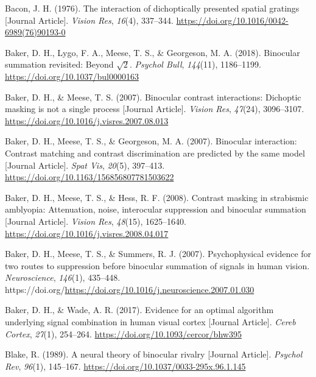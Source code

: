 \documentclass[
  12pt,
]{article}
\newlength{\cslhangindent}
\newenvironment{CSLReferences}[2] %
 {\begin{list}{}{%
  \setlength{\itemindent}{0pt}
  \setlength{\leftmargin}{0pt}
  \setlength{\parsep}{0pt}
  \ifodd #1
   \setlength{\leftmargin}{\cslhangindent}
   \setlength{\itemindent}{-1\cslhangindent}
  \fi
  \setlength{\itemsep}{#2\baselineskip}}}
 {\end{list}}
\begin{document}
\label{refs}
\begin{CSLReferences}{1}{0}
Bacon, J. H. (1976). The interaction of dichoptically presented spatial
gratings {[}Journal Article{]}. \emph{Vision Res}, \emph{16}(4),
337--344. \url{https://doi.org/10.1016/0042-6989(76)90193-0}

Baker, D. H., Lygo, F. A., Meese, T. S., \& Georgeson, M. A. (2018).
Binocular summation revisited: Beyond \(\sqrt{2}\). \emph{Psychol Bull},
\emph{144}(11), 1186--1199. \url{https://doi.org/10.1037/bul0000163}

Baker, D. H., \& Meese, T. S. (2007). Binocular contrast interactions:
Dichoptic masking is not a single process {[}Journal Article{]}.
\emph{Vision Res}, \emph{47}(24), 3096--3107.
\url{https://doi.org/10.1016/j.visres.2007.08.013}

Baker, D. H., Meese, T. S., \& Georgeson, M. A. (2007). Binocular
interaction: Contrast matching and contrast discrimination are predicted
by the same model {[}Journal Article{]}. \emph{Spat Vis}, \emph{20}(5),
397--413. \url{https://doi.org/10.1163/156856807781503622}

Baker, D. H., Meese, T. S., \& Hess, R. F. (2008). Contrast masking in
strabismic amblyopia: Attenuation, noise, interocular suppression and
binocular summation {[}Journal Article{]}. \emph{Vision Res},
\emph{48}(15), 1625--1640.
\url{https://doi.org/10.1016/j.visres.2008.04.017}

Baker, D. H., Meese, T. S., \& Summers, R. J. (2007). Psychophysical
evidence for two routes to suppression before binocular summation of
signals in human vision. \emph{Neuroscience}, \emph{146}(1), 435--448.
https://doi.org/\url{https://doi.org/10.1016/j.neuroscience.2007.01.030}

Baker, D. H., \& Wade, A. R. (2017). Evidence for an optimal algorithm
underlying signal combination in human visual cortex {[}Journal
Article{]}. \emph{Cereb Cortex}, \emph{27}(1), 254--264.
\url{https://doi.org/10.1093/cercor/bhw395}

Blake, R. (1989). A neural theory of binocular rivalry {[}Journal
Article{]}. \emph{Psychol Rev}, \emph{96}(1), 145--167.
\url{https://doi.org/10.1037/0033-295x.96.1.145}


\end{CSLReferences}
\end{document}
